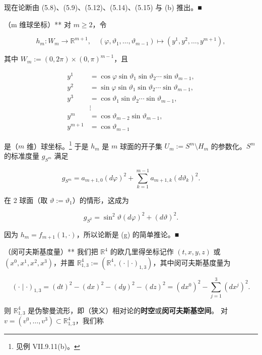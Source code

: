 \begin{example}
\begin{items}
现在论断由 (5.8)、(5.9)、(5.12)、(5.14)、(5.15) 与 (b) 推出。\nobreak\hspace{0.35em}■

\item

（m 维球坐标）** 对 $ m \ge 2 $，令

\[
h_m : W_m \to \mathbb{R}^{m+1}, \quad (\varphi, \vartheta_1, \ldots, \vartheta_{m-1}) \mapsto (y^1, y^2, \ldots, y^{m+1}),
\]

其中 $ W_m := (0, 2\pi) \times (0, \pi)^{m-1} $，且

\begin{equation*}
\begin{aligned}
y^1 &= \cos\varphi \sin\vartheta_1 \sin\vartheta_2 \cdots \sin\vartheta_{m-1}, \\ y^2 &= \sin\varphi \sin\vartheta_1 \sin\vartheta_2 \cdots \sin\vartheta_{m-1}, \\ y^3 &= \cos\vartheta_1 \sin\vartheta_2 \cdots \sin\vartheta_{m-1}, \\ & \vdots \\ y^m &= \cos\vartheta_{m-2} \sin\vartheta_{m-1}, \\ y^{m+1} &= \cos\vartheta_{m-1}
\end{aligned}
\end{equation*}

是（$ m $ 维）球坐标。\footnote{见例 VII.9.11(b)。} 于是 $ h_m $ 是 $ m $ 球面的开子集 $ U_m := S^m \setminus H_m $ 的参数化。$ S^m $ 的标准度量 $ g_{S^m} $ 满足

\[
g_{S^m} = a_{m+1,0}(d\varphi)^2 + \sum_{k=1}^{m-1} a_{m+1,k}(d\vartheta_k)^2.
\]

在 2 球面（取 $ \vartheta := \vartheta_1 $）的情形，这成为

\[
g_{S^2} = \sin^2\vartheta (d\varphi)^2 + (d\vartheta)^2.
\]

\proofhead
因为 $ h_m = f_{m+1}(1, \cdot) $，所以论断是 (g) 的简单推论。\nobreak\hspace{0.35em}■
\item

（闵可夫斯基度量）** 我们把 $ \mathbb{R}^4 $ 的欧几里得坐标记作 $ (t, x, y, z) $ 或 $ (x^0, x^1, x^2, x^3) $，并置 $ \mathbb{R}^4_{1,3} := (\mathbb{R}^4, (\cdot\mid\cdot)_{1,3}) $，其中闵可夫斯基度量为

\[
(\cdot\mid\cdot)_{1,3} = (dt)^2 - (dx)^2 - (dy)^2 - (dz)^2 = (dx^0)^2 - \sum_{j=1}^{3}(dx^j)^2.
\]

则 $ \mathbb{R}^4_{1,3} $ 是伪黎曼流形，即（狭义）相对论的\textbf{时空}或\textbf{闵可夫斯基空间}。
对 $ v = (v^0, \ldots, v^3) \subset \mathbb{R}^4_{1,3} $，我们称


\end{items}
\end{example}
